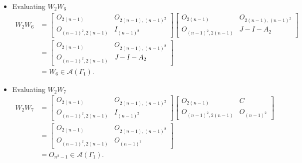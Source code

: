 \begin{itemize}
    \item Evaluating $W_2W_6$
    \begin{align*}
        W_2W_6
        &= \begin{bmatrix}
            O_{2(n-1)} & O_{2(n-1), (n-1)^2} \\
            O_{(n-1)^2, 2(n-1)} & I_{(n-1)^2}
        \end{bmatrix}\begin{bmatrix}
            O_{2(n-1)} & O_{2(n-1), (n-1)^2} \\
            O_{(n-1)^2, 2(n-1)} & J-I-A_2
        \end{bmatrix} \\
        &= \begin{bmatrix}
            O_{2(n-1)} & O_{2(n-1), (n-1)^2} \\
            O_{(n-1)^2, 2(n-1)} & J-I-A_2
        \end{bmatrix} \\
        &= W_6\in\mathcal{A}(\Gamma_1).
    \end{align*}
    
    \item Evaluating $W_2W_7$
    \begin{align*}
        W_2W_7
        &= \begin{bmatrix}
            O_{2(n-1)} & O_{2(n-1), (n-1)^2} \\
            O_{(n-1)^2, 2(n-1)} & I_{(n-1)^2}
        \end{bmatrix}\begin{bmatrix}
            O_{2(n-1)} & C \\
            O_{(n-1)^2, 2(n-1)} & O_{(n-1)^2}
        \end{bmatrix} \\
        &= \begin{bmatrix}
            O_{2(n-1)} & O_{2(n-1), (n-1)^2} \\
            O_{(n-1)^2, 2(n-1)} & O_{(n-1)^2}
        \end{bmatrix} \\
        &= O_{n^2-1}\in\mathcal{A}(\Gamma_1).
    \end{align*}
    

\end{itemize}
